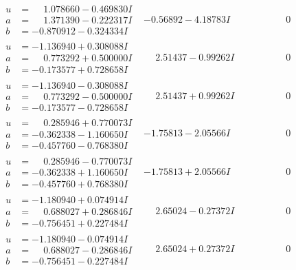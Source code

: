 \documentclass[1p]{elsarticle_modified}
\theoremstyle{definition}
\begin{document}
$$\begin{array}{c|c|c}
\begin{aligned}
u &= \phantom{-}1.078660 - 0.469830 I \\
a &= \phantom{-}1.371390 - 0.222317 I \\
b &= -0.870912 - 0.324334 I\end{aligned}
 & -0.56892 - 4.18783 I & \phantom{-0.000000 } 0 \\ \hline\begin{aligned}
u &= -1.136940 + 0.308088 I \\
a &= \phantom{-}0.773292 + 0.500000 I \\
b &= -0.173577 + 0.728658 I\end{aligned}
 & \phantom{-}2.51437 - 0.99262 I & \phantom{-0.000000 } 0 \\ \hline\begin{aligned}
u &= -1.136940 - 0.308088 I \\
a &= \phantom{-}0.773292 - 0.500000 I \\
b &= -0.173577 - 0.728658 I\end{aligned}
 & \phantom{-}2.51437 + 0.99262 I & \phantom{-0.000000 } 0 \\ \hline\begin{aligned}
u &= \phantom{-}0.285946 + 0.770073 I \\
a &= -0.362338 - 1.160650 I \\
b &= -0.457760 - 0.768380 I\end{aligned}
 & -1.75813 - 2.05566 I & \phantom{-0.000000 } 0 \\ \hline\begin{aligned}
u &= \phantom{-}0.285946 - 0.770073 I \\
a &= -0.362338 + 1.160650 I \\
b &= -0.457760 + 0.768380 I\end{aligned}
 & -1.75813 + 2.05566 I & \phantom{-0.000000 } 0 \\ \hline\begin{aligned}
u &= -1.180940 + 0.074914 I \\
a &= \phantom{-}0.688027 + 0.286846 I \\
b &= -0.756451 + 0.227484 I\end{aligned}
 & \phantom{-}2.65024 - 0.27372 I & \phantom{-0.000000 } 0 \\ \hline\begin{aligned}
u &= -1.180940 - 0.074914 I \\
a &= \phantom{-}0.688027 - 0.286846 I \\
b &= -0.756451 - 0.227484 I\end{aligned}
 & \phantom{-}2.65024 + 0.27372 I & \phantom{-0.000000 } 0\\

\end{array}$$
\end{document}
